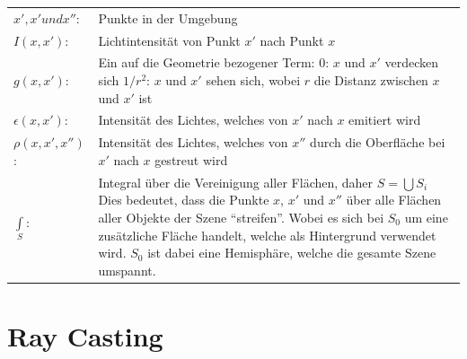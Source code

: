 \begin{tabular}{ l l }
    $ x', x' und x''   $: & Punkte in der Umgebung                                                                                                  \\
    $ I(x, x')         $: & Lichtintensität von Punkt $x'$ nach Punkt $x$                                                                           \\
    $ g(x, x')         $: & \parbox[t]{14cm}{Ein auf die Geometrie bezogener Term:                                                                  \\
                                 \hspace*{12mm} $0$:     \hspace*{6mm} $x$ und $x'$ verdecken sich                                                  \\
                                 \hspace*{12mm} $1/r^2$: \hspace*{1mm} $x$ und $x'$ sehen sich, wobei $r$ die Distanz zwischen $x$ und $x'$ ist}    \\
    $ \epsilon(x, x')  $: & Intensität des Lichtes, welches von $x'$ nach $x$ emitiert wird                                                         \\
    $ \rho(x, x', x'') $: & Intensität des Lichtes, welches von $x''$ durch die Oberfläche bei $x'$ nach $x$ gestreut wird                          \\
    $ \int\limits_{S}  $: & \parbox[t]{14cm}{Integral über die Vereinigung aller Flächen, daher $ S = \bigcup{S_{i}} $                              \\
                            Dies bedeutet, dass die Punkte $x$, $x'$ und $x''$ über alle Flächen aller Objekte der Szene ``streifen''.              \\
                            Wobei es sich bei $S_{0}$ um eine zusätzliche Fläche handelt, welche als Hintergrund verwendet wird.                    \\
                            $S_{0}$ ist dabei eine Hemisphäre, welche die gesamte Szene umspannt.}                                                  \\
\end{tabular}

\section{Ray Casting}
\label{sec:ray_casting}

